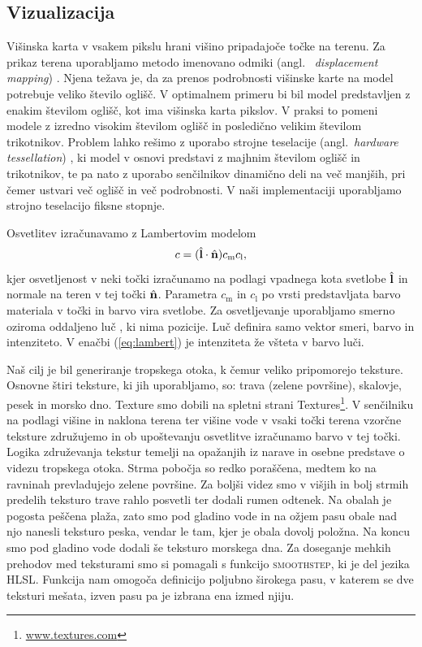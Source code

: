 \documentclass[9pt]{style/friteza}
\begin{document}
\subsection{Vizualizacija}
Višinska karta v vsakem pikslu hrani višino pripadajoče točke na terenu. Za prikaz terena uporabljamo metodo imenovano odmiki (angl.~ \textit{displacement mapping}) \cite{displacement_2008}. Njena težava je, da za prenos podrobnosti višinske karte na model potrebuje veliko število oglišč. V optimalnem primeru bi bil model predstavljen z enakim številom oglišč, kot ima višinska karta pikslov. V praksi to pomeni modele z izredno visokim številom oglišč in posledično velikim številom trikotnikov. Problem lahko rešimo z uporabo strojne teselacije (angl.~\emph{hardware tessellation}) \cite{tessellation_2016}, ki model v osnovi predstavi z majhnim številom oglišč in trikotnikov, te pa nato z uporabo senčilnikov dinamično deli na več manjših, pri čemer ustvari več oglišč in več podrobnosti. V naši implementaciji uporabljamo strojno teselacijo fiksne stopnje.

Osvetlitev izračunavamo z Lambertovim modelom \cite[str. 267--268]{interactive_graphics_2011}
\begin{equation} \label{eq:lambert}
c = (\hat{\mathbf{l}} \cdot \hat{\mathbf{n}}) c_\mathrm{m} c_\mathrm{l},
\end{equation}
kjer osvetljenost v neki točki izračunamo na podlagi vpadnega kota svetlobe $\hat{\mathbf{l}}$ in normale na teren v tej točki $\hat{\mathbf{n}}$. Parametra $c_\mathrm{m}$ in $c_\mathrm{l}$ po vrsti predstavljata barvo materiala v točki in barvo vira svetlobe. Za osvetljevanje uporabljamo smerno oziroma oddaljeno luč \cite[str. 264]{interactive_graphics_2011}, ki nima pozicije. Luč definira samo vektor smeri, barvo in intenziteto. V enačbi (\ref{eq:lambert}) je intenziteta že všteta v barvo luči.

Naš cilj je bil generiranje tropskega otoka, k čemur veliko pripomorejo teksture. Osnovne štiri teksture, ki jih uporabljamo, so: trava (zelene površine), skalovje, pesek in morsko dno. Texture smo dobili na spletni strani Textures\footnote{\href{http://www.textures.com/}{www.textures.com}}. V senčilniku na podlagi višine in naklona terena ter višine vode v vsaki točki terena vzorčne teksture združujemo in ob upoštevanju osvetlitve izračunamo barvo v tej točki. Logika združevanja tekstur temelji na opažanjih iz narave in osebne predstave o videzu tropskega otoka. Strma pobočja so redko poraščena, medtem ko na ravninah prevladujejo zelene površine. Za boljši videz smo v višjih in bolj strmih predelih teksturo trave rahlo posvetli ter dodali rumen odtenek. Na obalah je pogosta peščena plaža, zato smo pod gladino vode in na ožjem pasu obale nad njo nanesli teksturo peska, vendar le tam, kjer je obala dovolj položna. Na koncu smo pod gladino vode dodali še teksturo morskega dna. Za doseganje mehkih prehodov med teksturami smo si pomagali s funkcijo \textsc{smoothstep}, ki je del jezika HLSL. Funkcija nam omogoča definicijo poljubno širokega pasu, v katerem se dve teksturi mešata, izven pasu pa je izbrana ena izmed njiju.
\end{document}
